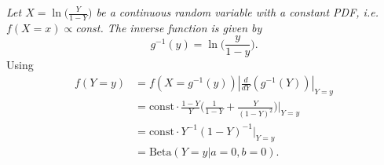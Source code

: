 \begin{example}
	\emph{Let $X = \ln\big(\frac{Y}{1-Y}\big)$ be a continuous random variable with a constant PDF, i.e. $f(X=x)\propto $const. The inverse function is given by}
	\begin{equation}
		g^{-1}(y) = \ln\bigg(\frac{y}{1-y}\bigg).
	\end{equation}
	Using 
	\begin{equation}
		\begin{split}
			f(Y=y) &= f\left( X = g^{-1}(y) \right) \left| \frac{d}{d Y} \left( g^{-1}(Y) \right) \right|_{Y=y}\\
			& = \text{const}\cdot \frac{1-Y}{Y}\bigg(\frac{1}{1-Y}+\frac{Y}{(1-Y)^2}\bigg)\bigg|_{Y=y}\\
			&=\text{const}\cdot Y^{-1}(1-Y)^{-1}|_{Y=y}\\
			&=\text{Beta}(Y=y|a=0,b=0).
		\end{split}
	\end{equation}
\end{example}

